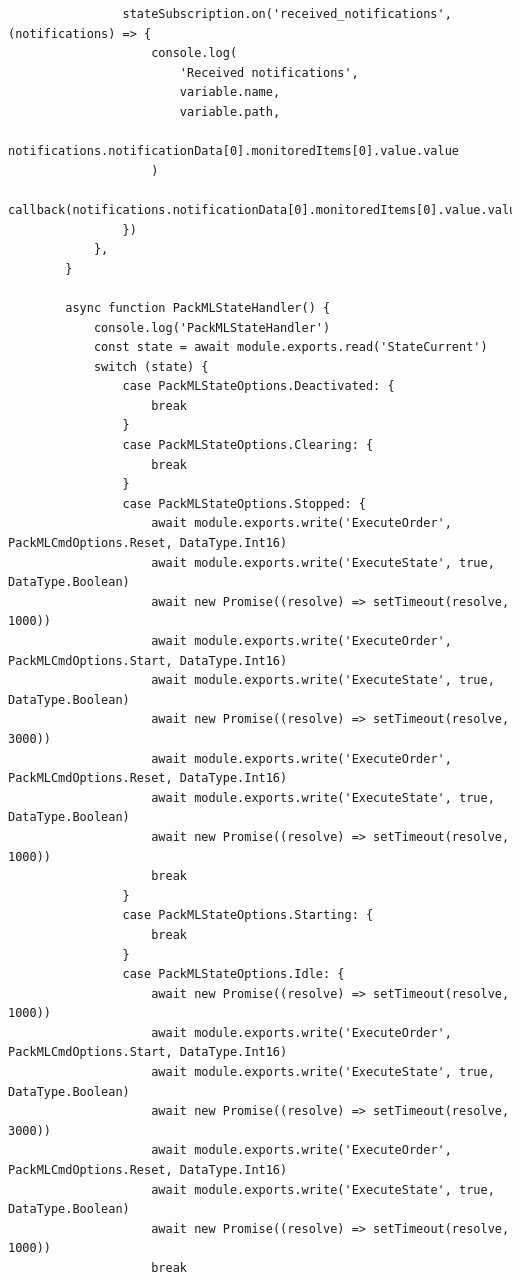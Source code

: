 \begin{center}
\begin{verbatim}
                stateSubscription.on('received_notifications', (notifications) => {
                    console.log(
                        'Received notifications',
                        variable.name,
                        variable.path,
                        notifications.notificationData[0].monitoredItems[0].value.value
                    )
                    callback(notifications.notificationData[0].monitoredItems[0].value.value)
                })
            },
        }

        async function PackMLStateHandler() {
            console.log('PackMLStateHandler')
            const state = await module.exports.read('StateCurrent')
            switch (state) {
                case PackMLStateOptions.Deactivated: {
                    break
                }
                case PackMLStateOptions.Clearing: {
                    break
                }
                case PackMLStateOptions.Stopped: {
                    await module.exports.write('ExecuteOrder', PackMLCmdOptions.Reset, DataType.Int16)
                    await module.exports.write('ExecuteState', true, DataType.Boolean)
                    await new Promise((resolve) => setTimeout(resolve, 1000))
                    await module.exports.write('ExecuteOrder', PackMLCmdOptions.Start, DataType.Int16)
                    await module.exports.write('ExecuteState', true, DataType.Boolean)
                    await new Promise((resolve) => setTimeout(resolve, 3000))
                    await module.exports.write('ExecuteOrder', PackMLCmdOptions.Reset, DataType.Int16)
                    await module.exports.write('ExecuteState', true, DataType.Boolean)
                    await new Promise((resolve) => setTimeout(resolve, 1000))
                    break
                }
                case PackMLStateOptions.Starting: {
                    break
                }
                case PackMLStateOptions.Idle: {
                    await new Promise((resolve) => setTimeout(resolve, 1000))
                    await module.exports.write('ExecuteOrder', PackMLCmdOptions.Start, DataType.Int16)
                    await module.exports.write('ExecuteState', true, DataType.Boolean)
                    await new Promise((resolve) => setTimeout(resolve, 3000))
                    await module.exports.write('ExecuteOrder', PackMLCmdOptions.Reset, DataType.Int16)
                    await module.exports.write('ExecuteState', true, DataType.Boolean)
                    await new Promise((resolve) => setTimeout(resolve, 1000))
                    break

\end{verbatim}
\end{center}

